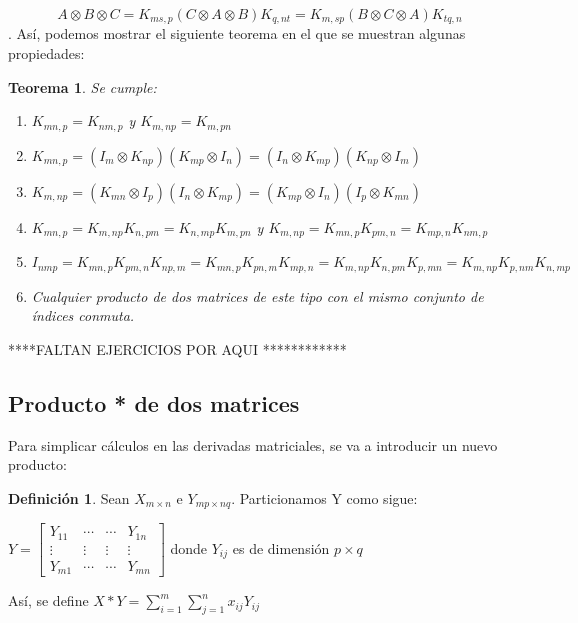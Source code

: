 \documentclass{article}
\theoremstyle{theorem-style}  %
\newtheorem{theorem}{Teorema}[section]  %
\theoremstyle{definition}
\newtheorem{definition}{Definición}[section]
\theoremstyle{example-style}
\begin{document}
	$$ A \otimes B \otimes C = K_{ms,p}(C \otimes A \otimes B)K_{q,nt} = K_{m,sp}(B \otimes C \otimes A)K_{tq,n}$$. Así, podemos mostrar el siguiente teorema en el que se muestran algunas propiedades:
	
	\begin{theorem} Se cumple:\\
		\begin{enumerate}
			\item  $K_{mn,p}=K_{nm,p}$ y $K_{m,np} = K_{m,pn} $ 
			
			\item $K_{mn,p}=(I_m \otimes K_{np})(K_{mp} \otimes I_n)=(I_n \otimes K_{mp})(K_{np} \otimes I_m)$
			
			\item $K_{m,np}=(K_{mn} \otimes I_p)(I_n \otimes K_{mp})=(K_{mp} \otimes I_n)(I_p \otimes K_{mn})$
			
			\item $K_{mn,p}= K_{m,np}K_{n,pm} = K_{n,mp}K_{m,pn}$ y $K_{m,np}= K_{mn,p}K_{pm,n} = K_{mp,n}K_{nm,p}$
			
			\item $I_{nmp}= K_{mn,p}K_{pm,n}K_{np,m}= K_{mn,p}K_{pn,m}K_{mp,n}=K_{m,np}K_{n,pm}K_{p,mn}=K_{m,np}K_{p,nm}K_{n,mp}$
			
			\item Cualquier producto de dos matrices de este tipo con el mismo conjunto de índices conmuta.
		\end{enumerate}	
	\end{theorem}
	
	****FALTAN EJERCICIOS POR AQUI ************

\newpage

\subsection{Producto * de dos matrices}
	Para simplicar cálculos en las derivadas matriciales, se va a introducir un nuevo producto: 
	
	\begin{definition}
		Sean $X_{m \times n}$ e $Y_{mp \times nq} $. Particionamos Y como sigue:
		
		$Y=\begin{bmatrix}
		Y_{11} & \cdots & \cdots & Y_{1n}\\
		\vdots & \vdots & \vdots & \vdots \\
		Y_{m1} & \cdots & \cdots & Y_{mn} \end{bmatrix}$ donde $Y_{ij}$ es de dimensión $p \times q$
		
		Así, se define $X*Y = \sum_{i=1}^{m}\sum_{j=1}^{n} x_{ij}Y_{ij}$ 
		
	\end{definition}
\end{document}
